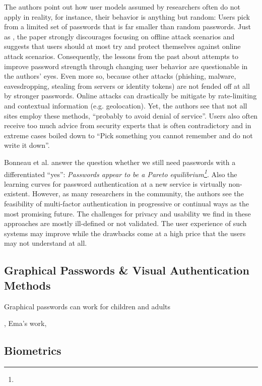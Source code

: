 The authors point out how user models assumed by researchers often do not apply in reality, for instance, their behavior is anything but random: Users pick from a limited set of passwords that is far smaller than random passwords. Just as \cite{Florencio2014PasswordPortfoliosFiniteUser}, the paper strongly discourages focusing on offline attack scenarios and suggests that users should at most try and protect themselves against online attack scenarios. Consequently, the lessons from the past about attempts to improve password strength through changing user behavior are questionable in the authors' eyes. Even more so, because other attacks (phishing, malware, eavesdropping, stealing from servers or identity tokens) are not fended off at all by stronger passwords. Online attacks can drastically be mitigate by rate-limiting and contextual information (e.g. geolocation). Yet, the authors see that not all sites employ these methods, ``probably to avoid denial of service''. Users also often receive too much advice from security experts that is often contradictory and in extreme cases boiled down to ``Pick something you cannot remember and do not write it down''. 

Bonneau et al. answer the question whether we still need passwords with a differentiated ``yes'': \textit{Passwords appear to be a Pareto equilibrium\footnote{}}. Also the learning curves for password authentication at a new service is virtually non-existent. However, as many researchers in the community, the authors see the feasibility of multi-factor authentication in progressive or continual ways as the most promising future. The challenges for privacy and usability we find in these approaches are mostly ill-defined or not validated. The user experience of such systems may improve while the drawbacks come at a high price that the users may not understand at all. 

	\subsection{Graphical Passwords \& Visual Authentication Methods}
Graphical passwords can work for children and adults \cite{Imran2015PWsAdultsChildren}

, Ema's work, \cite{Renaud2009VisualSnakeOil} 

	\subsection{Biometrics}
	
